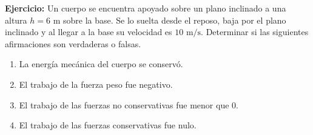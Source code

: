 \documentclass[11pt, a4paper]{article}
\begin{document}
\noindent
\textbf{Ejercicio:} Un cuerpo se encuentra apoyado sobre un plano inclinado a una altura $h = 6\text{ m}$ sobre la base. Se lo suelta desde el reposo, baja por el plano inclinado y al llegar a la base su velocidad es $10\text{ m/s}$. Determinar si las siguientes afirmaciones son verdaderas o falsas.

\vspace{0.5em}

\begin{enumerate}[label=(\alph*), leftmargin=2em, itemsep=0.6em]
\item La energía mecánica del cuerpo se conservó.
\item El trabajo de la fuerza peso fue negativo.
\item El trabajo de las fuerzas no conservativas fue menor que 0.
\item El trabajo de las fuerzas conservativas fue nulo.
\end{enumerate}
\end{document}
